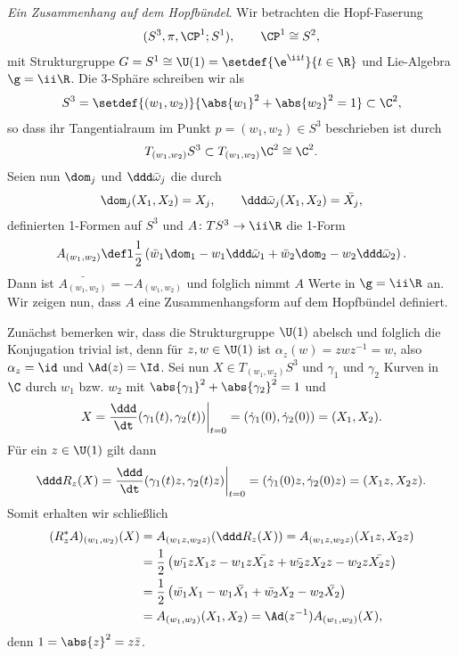 \documentclass[%
	paper=a5,%
	fleqn,%
	DIV=18,%
	BCOR=0mm,
	fontsize=11pt,
	titlepage=false,%
	bibliography=totoc,
	DIV=18,%
	twoside=true,
	pdftitle=Riemannsche Geometrie,
	pdfauthor=Uwe Semmelmann,
	numbers=noendperiod]%
	{scrbook}
\begin{document}
\begin{ex}
\newcommand{\dqomega}{\ddd \bar{\omega}}
\textit{Ein Zusammenhang auf dem Hopfbündel}.
Wir betrachten die Hopf-Faserung
\begin{align*}
(S^3,\pi,\CP^1;S^1),\qquad \CP^1 \cong S^2,
\end{align*}
mit Strukturgruppe $G = S^1\cong \U(1) = \setdef{\e^{\ii t}}{t\in\R}$ und
Lie-Algebra $\g = \ii\R$. Die 3-Sphäre schreiben wir als
\begin{align*}
S^3 = \setdef{(w_1,w_2)}{\abs{w_1}^2 + \abs{w_2}^2 = 1} \subset\C^2,
\end{align*}
so dass ihr Tangentialraum im Punkt $p=(w_1,w_2)\in S^3$ beschrieben ist durch
\begin{align*}
T_{(w_1,w_2)}S^3\subset T_{(w_1,w_2)}\C^2 \cong \C^2.
\end{align*}
Seien nun $\dom_j$ und $\dqomega_j$ die durch
\begin{align*}
\dom_j(X_1,X_2) = X_j,\qquad \dqomega_j(X_1,X_2) = \bar{X_j},
\end{align*}
definierten 1-Formen auf $S^3$ und $A\colon TS^3\to \ii\R$ die 1-Form
\begin{align*}
A_{(w_1,w_2)} \defl \frac{1}{2}\left(\bar{w}_1 \dom_1 - w_1\dqomega_1
+ \bar{w}_2 \dom_2 - w_2\dqomega_2\right).
\end{align*}
Dann ist $\bar{A_{(w_1,w_2)}} = - A_{(w_1,w_2)}$ und folglich nimmt $A$ Werte in
$\g = \ii\R$ an.
Wir zeigen nun, dass $A$ eine Zusammenhangsform auf dem
Hopfbündel definiert.

Zunächst bemerken wir, dass die Strukturgruppe $\U(1)$
abelsch und folglich die Konjugation trivial ist, denn für $z,w\in \U(1)$
ist $\alpha_z(w) = zwz^{-1} = w$, also $\alpha_z = \id$ und $\Ad(z) = \Id$.
Sei nun $X\in T_{(w_1,w_2)}S^3$ und $\gamma_1$ und $\gamma_2$ Kurven in $\C$
durch $w_1$ bzw. $w_2$ mit $\abs{\gamma_1}^2 + \abs{\gamma_2}^2
= 1$ und
\begin{align*}
X = \frac{\ddd}{\dt} (\gamma_1(t),\gamma_2(t))\bigg|_{t=0}
= (\dot{\gamma}_1(0),\dot{\gamma}_2(0)) = (X_1,X_2).
\end{align*} 
Für ein $z\in \U(1)$ gilt dann
\begin{align*}
\ddd R_z(X) = \frac{\ddd}{\dt} (\gamma_1(t)z,\gamma_2(t)z)\bigg|_{t=0}
= (\dot{\gamma}_1(0)z,\dot{\gamma}_2(0)z) = (X_1z,X_2z).
\end{align*}
Somit erhalten wir schließlich
\begin{align*}
(R_z^*A)_{(w_1,w_2)}(X) &= A_{(w_1z,w_2z)}(\ddd R_{z}(X))
= A_{(w_1z,w_2z)}(X_1z,X_2z)\\
&= \frac{1}{2}
\left(\bar{w_1z}X_1z - w_1z\bar{X_1z} + \bar{w_2z}X_2z - w_2z\bar{X_2z}
\right)\\
&= \frac{1}{2}
\left(\bar{w_1}X_1 - w_1\bar{X_1} + \bar{w_2}X_2 - w_2\bar{X_2}
\right)\\
&= A_{(w_1,w_2)}(X_1,X_2) = \Ad(z^{-1})A_{(w_1,w_2)}(X), 
\end{align*}
denn $1 = \abs{z}^2 = z\bar{z}$.


\end{ex}
\end{document}
